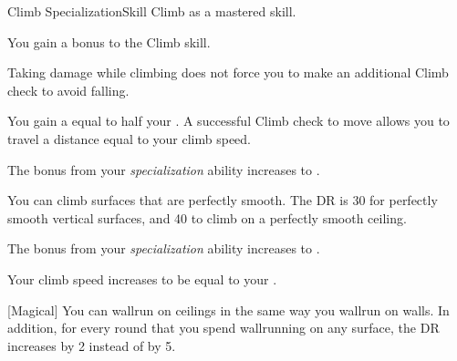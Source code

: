     \begin{feat}{Climb Specialization}{Skill}
        \featpre Climb as a mastered skill.

         You gain a  bonus to the Climb skill.

         Taking damage while climbing does not force you to make an additional Climb check to avoid falling.

         You gain a  equal to half your .
        A successful Climb check to move allows you to travel a distance equal to your climb speed.

         The bonus from your \textit{specialization} ability increases to .

         You can climb surfaces that are perfectly smooth.
        The DR is 30 for perfectly smooth vertical surfaces, and 40 to climb on a perfectly smooth ceiling.

         The bonus from your \textit{specialization} ability increases to .

         Your climb speed increases to be equal to your .

        [Magical] You can wallrun on ceilings in the same way you wallrun on walls.
        In addition, for every round that you spend wallrunning on any surface, the DR increases by 2 instead of by 5.
    \end{feat}

